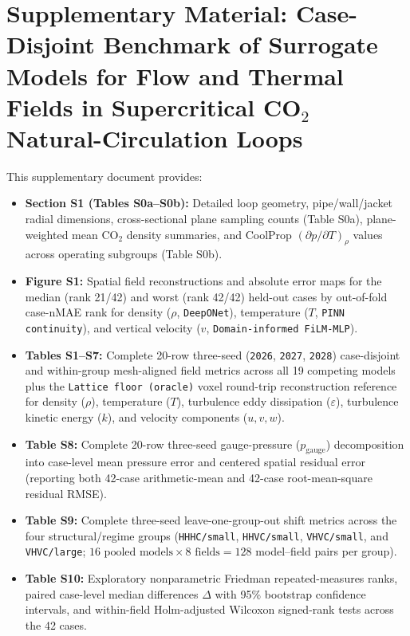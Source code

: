 \documentclass[10pt]{article}
\begin{document}
\section*{Supplementary Material: Case-Disjoint Benchmark of Surrogate Models for Flow and Thermal Fields in Supercritical CO$_2$ Natural-Circulation Loops}
This supplementary document provides:
\begin{itemize}
\item \textbf{Section S1 (Tables S0a--S0b):} Detailed loop geometry, pipe/wall/jacket radial dimensions, cross-sectional plane sampling counts (Table S0a), plane-weighted mean $\mathrm{CO}_2$ density summaries, and CoolProp $(\partial p/\partial T)_\rho$ values across operating subgroups (Table S0b).
\item \textbf{Figure S1:} Spatial field reconstructions and absolute error maps for the median (rank 21/42) and worst (rank 42/42) held-out cases by out-of-fold case-nMAE rank for density ($\rho$, \texttt{DeepONet}), temperature ($T$, \texttt{PINN continuity}), and vertical velocity ($v$, \texttt{Domain-informed FiLM-MLP}).
\item \textbf{Tables S1--S7:} Complete 20-row three-seed (\texttt{2026}, \texttt{2027}, \texttt{2028}) case-disjoint and within-group mesh-aligned field metrics across all 19 competing models plus the \texttt{Lattice floor (oracle)} voxel round-trip reconstruction reference for density ($\rho$), temperature ($T$), turbulence eddy dissipation ($\varepsilon$), turbulence kinetic energy ($k$), and velocity components ($u, v, w$).
\item \textbf{Table S8:} Complete 20-row three-seed gauge-pressure ($p_{\mathrm{gauge}}$) decomposition into case-level mean pressure error and centered spatial residual error (reporting both 42-case arithmetic-mean and 42-case root-mean-square residual RMSE).
\item \textbf{Table S9:} Complete three-seed leave-one-group-out shift metrics across the four structural/regime groups (\texttt{HHHC/small}, \texttt{HHVC/small}, \texttt{VHVC/small}, and \texttt{VHVC/large}; $16\text{ pooled models} \times 8\text{ fields} = 128$ model--field pairs per group).
\item \textbf{Table S10:} Exploratory nonparametric Friedman repeated-measures ranks, paired case-level median differences $\Delta$ with 95\% bootstrap confidence intervals, and within-field Holm-adjusted Wilcoxon signed-rank tests across the 42 cases.
\end{itemize}
\end{document}
